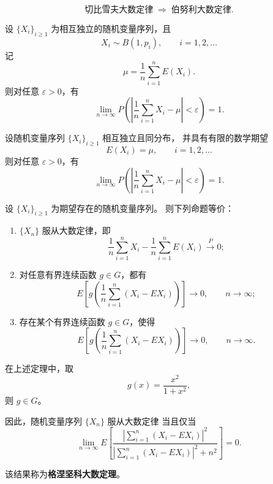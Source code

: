 \[
\text{切比雪夫大数定律}
\;\Longrightarrow\;
\text{伯努利大数定律}.
\]
\begin{theorem}[泊松大数定律]
设 $\{X_i\}_{i\ge1}$ 为相互独立的随机变量序列，且
\[
X_i\sim B(1,p_i), \qquad i=1,2,\dots
\]
记
\[
\mu=\frac{1}{n}\sum_{i=1}^n E(X_i).
\]
则对任意 $\varepsilon>0$，有
\[
\lim_{n\to\infty}
P\!\left(
\left|
\frac{1}{n}\sum_{i=1}^n X_i-\mu
\right|<\varepsilon
\right)=1.
\]
\end{theorem}
\begin{theorem}[辛钦大数定律]
设随机变量序列 $\{X_i\}_{i\ge1}$ 相互独立且同分布，
并具有有限的数学期望
\[
E(X_i)=\mu,\qquad i=1,2,\dots
\]
则对任意 $\varepsilon>0$，有
\[
\lim_{n\to\infty}
P\!\left(
\left|
\frac{1}{n}\sum_{i=1}^n X_i-\mu
\right|<\varepsilon
\right)=1.
\]
\end{theorem}
\begin{theorem}[大数定律成立的条件]
设 $\{X_i\}_{i\ge1}$ 为期望存在的随机变量序列。
则下列命题等价：
\begin{enumerate}
  \item $\{X_n\}$ 服从大数定律，即
  \[
  \frac{1}{n}\sum_{i=1}^n X_i-\frac{1}{n}\sum_{i=1}^n E(X_i)
  \xrightarrow{P} 0;
  \]

  \item 对任意有界连续函数 $g\in G$，都有
  \[
  E\!\left[
  g\!\left(
  \frac{1}{n}\sum_{i=1}^n (X_i-E X_i)
  \right)
  \right]
  \longrightarrow 0,
  \qquad n\to\infty;
  \]

  \item 存在某个有界连续函数 $g\in G$，使得
  \[
  E\!\left[
  g\!\left(
  \frac{1}{n}\sum_{i=1}^n (X_i-E X_i)
  \right)
  \right]
  \longrightarrow 0,
  \qquad n\to\infty.
  \]
\end{enumerate}
\end{theorem}
\begin{note}
在上述定理中，取
\[
g(x)=\frac{x^{2}}{1+x^{2}},
\]
则 $g\in G$。

因此，随机变量序列 $\{X_n\}$ 服从大数定律
当且仅当
\[
\lim_{n\to\infty}
E\!\left[
\frac{\left|\sum_{i=1}^{n}(X_i-E X_i)\right|^{2}}
{\left|\sum_{i=1}^{n}(X_i-E X_i)\right|^{2}+n^{2}}
\right]
=0.
\]

该结果称为\textbf{格涅坚科大数定理}。
\end{note}

